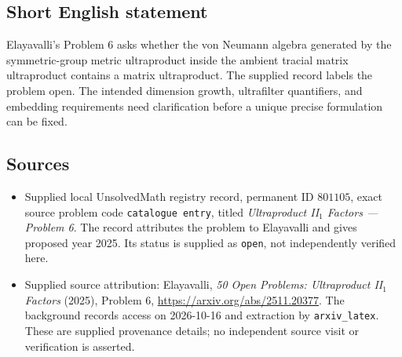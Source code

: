 \documentclass[11pt]{article}
\begin{document}
\subsection{Short English statement}
Elayavalli's Problem 6 asks whether the von Neumann algebra generated by the symmetric-group metric ultraproduct inside the ambient tracial matrix ultraproduct contains a matrix ultraproduct. The supplied record labels the problem open. The intended dimension growth, ultrafilter quantifiers, and embedding requirements need clarification before a unique precise formulation can be fixed.
\subsection{Sources}
\begin{itemize}
\item Supplied local UnsolvedMath registry record, permanent ID \(801105\), exact source problem code \texttt{catalogue entry}, titled \emph{Ultraproduct II\(_1\) Factors --- Problem 6}. The record attributes the problem to Elayavalli and gives proposed year 2025. Its status is supplied as \texttt{open}, not independently verified here.
\item Supplied source attribution: Elayavalli, \emph{50 Open Problems: Ultraproduct II\(_1\) Factors} (2025), Problem 6, \url{https://arxiv.org/abs/2511.20377}. The background records access on 2026-10-16 and extraction by \texttt{arxiv\_latex}. These are supplied provenance details; no independent source visit or verification is asserted.
\end{itemize}
\end{document}
